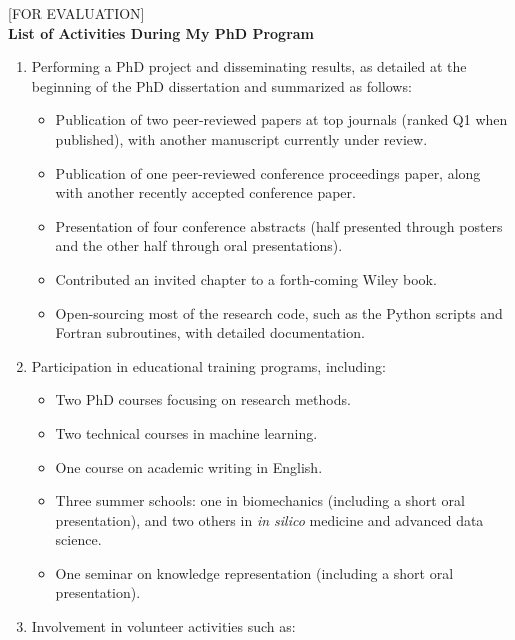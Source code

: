 \newpage
\thispagestyle{empty}
\mbox{}
\clearpage

\pagestyle{empty}
\clearpage

\begin{center}
    \small [FOR EVALUATION]\\
    \vspace{1em}
   \textbf{\Large List of Activities During My PhD Program}\\
\end{center}

\begin{enumerate}[leftmargin=*]
    \item Performing a PhD project and disseminating results, as detailed at the beginning of the PhD dissertation and summarized as follows:
    \begin{itemize}
        \item Publication of two peer-reviewed papers at top journals (ranked Q1 when published), with another manuscript currently under review.
        \item Publication of one peer-reviewed conference proceedings paper, along with another recently accepted conference paper.
        \item Presentation of four conference abstracts (half presented through posters and the other half through oral presentations).
        \item Contributed an invited chapter to a forth-coming Wiley book.
        \item Open-sourcing most of the research code, such as the Python scripts and Fortran subroutines, with detailed documentation.
    \end{itemize}
    \item Participation in educational training programs, including:
    \begin{itemize}
        \item Two PhD courses focusing on research methods.
        \item Two technical courses in machine learning.
        \item One course on academic writing in English.
        \item Three summer schools: one in biomechanics (including a short oral presentation), and two others in \textit{in silico} medicine and advanced data science.
        \item One seminar on knowledge representation (including a short oral presentation).
    \end{itemize}
    \item Involvement in volunteer activities such as:

\end{enumerate}
